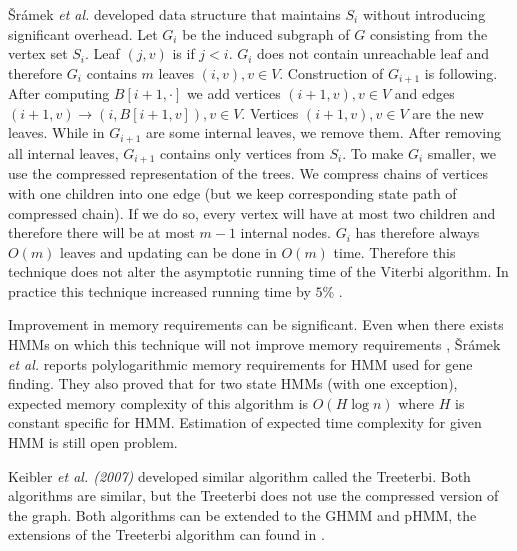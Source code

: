 {\v S}r{\'a}mek {\it et al.} developed data structure that maintains $S_i$
without introducing significant overhead.  Let $G_i$ be the induced subgraph of $G$
consisting from the vertex set $S_i$. Leaf $(j,v)$ is  if
$j<i$.  $G_i$ does not contain unreachable leaf and therefore $G_i$ contains $m$
leaves $(i,v),v\in V$. Construction of $G_{i+1}$ is following.
After computing $B[i+1,\cdot]$ we add vertices $(i+1,v),v\in V$ and edges 
$(i+1,v)\to (i,B[i+1,v]),v\in V$. Vertices $(i+1,v),v\in V$ are the new leaves.
While in $G_{i+1}$ are some internal leaves, we remove them.
After removing all internal leaves, $G_{i+1}$ contains only vertices from $S_i$.
To make $G_i$ smaller, we use the compressed representation of the trees. We compress
chains of vertices with one children into one edge (but we keep
corresponding state path of compressed chain). If we do so, every vertex will
have at most two children and therefore there will be at most $m-1$ internal
nodes. $G_i$ has therefore always $O(m)$ leaves and updating can be done in
$O(m)$ time. Therefore this technique does not alter the asymptotic running time
of the Viterbi algorithm. In practice this technique increased running time by
$5$\% \cite{Sramek2007}.

Improvement in memory requirements can be significant. Even when there exists
HMMs on which this technique will not improve memory requirements
\cite{Sramek2007}, {\v S}r{\'a}mek {\it et al.} reports polylogarithmic 
memory requirements for HMM used for gene finding.
They also proved that for two
state HMMs (with one exception), expected memory complexity of this algorithm is
$O(H\log n)$ where $H$ is constant specific for HMM. Estimation of expected time
complexity for given HMM is still open problem.

Keibler {\it et al. (2007)} developed similar algorithm called the Treeterbi. Both
algorithms are similar, but the Treeterbi does not use the compressed version of the
graph. Both algorithms can be extended to the GHMM and pHMM, the extensions of
the Treeterbi algorithm can found in \cite{Keibler2007}.
